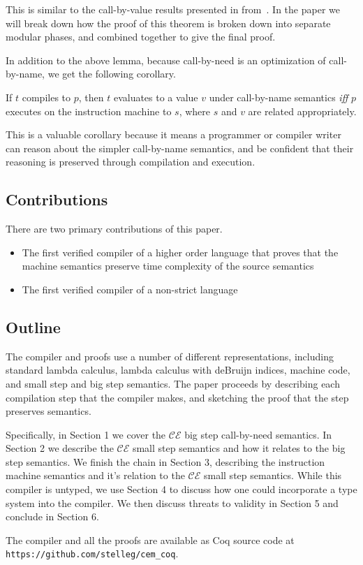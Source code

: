This is similar to the call-by-value results presented in
from~\cite{chlipala2007certified}. In the paper we will break down how the proof
of this theorem is broken down into separate modular phases, and combined
together to give the final proof. 

In addition to the above lemma, because call-by-need is an optimization of
call-by-name, we get the following corollary.

\begin{corollary}
If $t$ compiles to $p$, then $t$ evaluates to a value $v$ under call-by-name
semantics \emph{iff} $p$ executes on the instruction machine to $s$, where $s$
and $v$ are related appropriately.
\end{corollary}

This is a valuable corollary because it means a programmer or compiler writer
can reason about the simpler call-by-name semantics, and be confident that their
reasoning is preserved through compilation and execution.

\subsection{Contributions}
There are two primary contributions of this paper. 
\begin{itemize}
\item The first verified compiler of a higher order language that proves that
the machine semantics preserve time complexity of the source semantics
\item The first verified compiler of a non-strict language
\end{itemize}

\subsection{Outline}
The compiler and proofs use a number of different representations, including
standard lambda calculus, lambda calculus with deBruijn indices, machine
code, and small step and big step semantics. The paper proceeds by describing
each compilation step that the compiler makes, and sketching the proof that the
step preserves semantics.

Specifically, in Section 1 we cover the $\mathcal{CE}$ big step call-by-need
semantics. In Section 2 we describe the $\mathcal{CE}$ small step semantics and
how it relates to the big step semantics. We finish the chain in Section 3,
describing the instruction machine semantics and it's relation to the
$\mathcal{CE}$ small step semantics.  While this compiler is untyped, we use
Section 4 to discuss how one could incorporate a type system into the compiler.
We then discuss threats to validity in Section 5 and conclude in Section 6. 

The compiler and all the proofs are available as Coq source code at
\texttt{https://github.com/stelleg/cem\_coq}.


